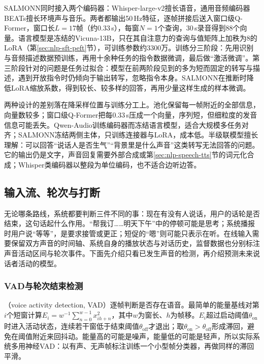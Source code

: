 SALMONN同时接入两个编码器：Whisper-large-v2擅长语音，通用音频编码器BEATs擅长环境声与音乐。两者都输出50\,Hz特征，逐帧拼接后送入窗口级Q-Former，窗口长$L=17$帧（约0.33\,s），每窗$N=1$个查询，30\,s录音得到88个向量。语言模型是冻结的Vicuna-13B，只在其自注意力的查询与值矩阵上加秩为8的LoRA（第\ref{sec:nlp-sft-peft}节），可训练参数约3300万。训练分三阶段：先用识别与音频描述数据预训练，再用十余种任务的指令数据微调，最后做“激活微调”。第三阶段针对的问题是任务过拟合：模型在前两阶段见到的多为短而固定的转写与描述，遇到开放指令时仍倾向于输出转写，忽略指令本身。SALMONN在推断时降低LoRA缩放系数，得到较长、较多样的回答，再用少量这样生成的样本微调。

两种设计的差别落在降采样位置与训练分工上。池化保留每一帧附近的全部信息，向量数较多；窗口级Q-Former把每0.33\,s压成一个向量，序列短，但细粒度的发音信息可能丢失。Qwen-Audio训练编码器而冻结语言模型，适合大规模多任务对齐；SALMONN冻结两侧主体，只训练连接器与LoRA，成本低。半级联模型擅长理解：可以回答“说话人是否生气”“背景里是什么声音”这类转写无法回答的问题。它的输出仍是文字，声音回复需要外部合成或第\ref{sec:nlp-speech-tts}节的词元化合成；Whisper类编码器以整段为单位编码，也不适合边听边答。

\subsection{输入流、轮次与打断}
\label{sec:nlp-speech-turns}

无论哪条路线，系统都要判断三件不同的事：现在有没有人说话，用户的话轮是否结束，这句话起什么作用。“帮我订……明天下午”中的停顿可能是思考；系统播报时用户说“等等”，是要求接管或更正；短促的“嗯”则可能只表示在听。在线输入需要保留双方声音的时间轴、系统自身的播放状态与对话历史，监督数据也分别标注声音活动区间与轮次事件。下面先介绍只看已发生声音的检测，再介绍预测未来说话者活动的模型。

\subsubsection{VAD与轮次结束检测}
\label{sec:nlp-speech-vad}

（voice activity detection, VAD）逐帧判断是否存在语音。最简单的能量基线对第$i$个短窗计算$E_i=w^{-1}\sum_{n=0}^{w-1}x_{ih+n}^2$，其中$w$为窗长、$h$为帧移。$E_i$超过启动阈值$\theta_{\mathrm{on}}$时进入活动状态，连续若干窗低于结束阈值$\theta_{\mathrm{off}}$才退出；取$\theta_{\mathrm{on}}>\theta_{\mathrm{off}}$形成滞回，避免在阈值附近来回抖动。能量高的可能是噪声，能量低的可能是轻声，所以实际系统多用神经VAD：以有声、无声帧标注训练一个小型帧分类器，再做同样的滞回平滑。

